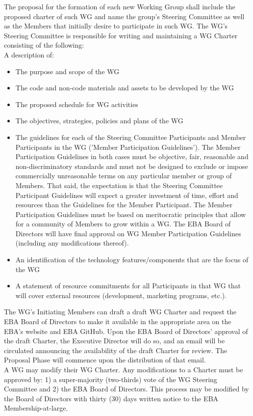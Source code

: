 \documentclass{article}
\begin{document}
The proposal for the formation of each new Working Group shall include the proposed charter of such WG and name the group's Steering Committee as well as the Members that initially desire to participate in such WG. 
The WG's Steering Committee is responsible for writing and maintaining a WG Charter consisting of the following: \\

A description of: \\

\begin{itemize}
	\item The purpose and scope of the WG
	\item The code and non-code materials and assets to be developed by the WG
	\item The proposed schedule for WG activities
	\item The objectives, strategies, policies and plans of the WG
	\item The guidelines for each of the Steering Committee Participants and Member Participants in the WG ('Member Participation Guidelines'). 
	The Member Participation Guidelines in both cases must be objective, fair, reasonable and non-discriminatory standards and must not be designed to exclude or impose commercially unreasonable terms on any particular member or group of Members. 
	That said, the expectation is that the Steering Committee Participant Guidelines will expect a greater investment of time, effort and resources than the Guidelines for the Member Participant. 
	The Member Participation Guidelines must be based on meritocratic principles that allow for a community of Members to grow within a WG. 
	The EBA Board of Directors will have final approval on WG Member Participation Guidelines (including any modifications thereof).
	\item An identification of the technology features/components that are the focus of the WG
	\item A statement of resource commitments for all Participants in that WG that will cover external resources (development, marketing programs, etc.).
\end{itemize}

The WG's Initiating Members can draft a draft WG Charter and request the EBA Board of Directors to make it available in the appropriate area on the EBA's website and EBA GitHub.
 Upon the EBA Board of Directors' approval of the draft Charter, the Executive Director will do so, and an email will be circulated announcing the availability of the draft Charter for review. 
 The Proposal Phase will commence upon the distribution of that email. \\
A WG may modify their WG Charter. 
Any modifications to a Charter must be approved by: 1) a super-majority (two-thirds) vote of the WG Steering Committee and 2) the EBA Board of Directors. 
This process may be modified by the Board of Directors with thirty (30) days written notice to the EBA Membership-at-large.
\end{document}

